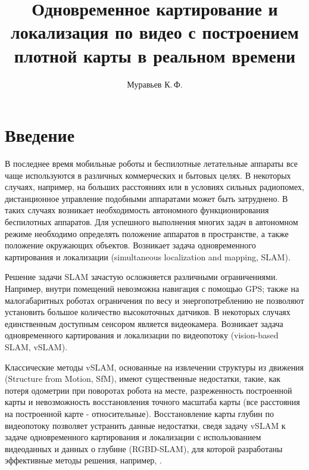 \documentclass{mipt-thesis-ms}
\title{Одновременное картирование и локализация по видео с построением плотной карты в реальном времени}
\author{Муравьев К.\,Ф.}
\begin{document}
	\titlecontents
	
	
	\chapter{Введение}
	
	В последнее время мобильные роботы и беспилотные летательные аппараты все чаще используются в различных коммерческих и бытовых целях. В некоторых случаях, например, на больших расстояниях или в условиях сильных радиопомех, дистанционное управление подобными аппаратами может быть затруднено. В таких случаях возникает необходимость автономного функционирования беспилотных аппаратов. Для успешного выполнения многих задач в автономном режиме необходимо определять положение аппаратов в пространстве, а также положение окружающих объектов. Возникает задача одновременного картирования и локализации (simultaneous localization and mapping, SLAM).
	
	Решение задачи SLAM зачастую осложняется различными ограничениями. Например, внутри помещений невозможна навигация с помощью GPS; также на малогабаритных роботах ограничения по весу и энергопотреблению не позволяют установить большое количество высокоточных датчиков. В некоторых случаях единственным доступным сенсором является видеокамера. Возникает задача одновременного картирования и локализации по видеопотоку (vision-based SLAM, vSLAM).
	
	Классические методы vSLAM, основанные на извлечении структуры из движения (Structure from Motion, SfM), имеют существенные недостатки, такие, как потеря одометрии при поворотах робота на месте, разреженность построенной карты и невозможность восстановления точного масштаба карты (все расстояния на построенной карте - относительные). Восстановление карты глубин по видеопотоку позволяет устранить данные недостатки, сведя задачу vSLAM к задаче одновременного картирования и локализации с использованием видеоданных и данных о глубине (RGBD-SLAM), для которой разработаны эффективные методы решения, например, \cite{labbe2011memory}.
	
\end{document}
